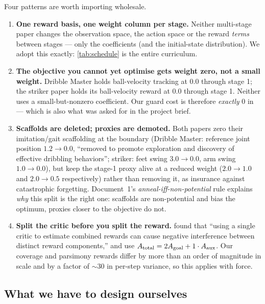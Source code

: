\documentclass[11pt,a4paper]{article}
\begin{document}
Four patterns are worth importing wholesale.

\begin{enumerate}[label=\textbf{P\arabic*.},leftmargin=2.7em]
  \item \textbf{One reward basis, one weight column per stage.} Neither multi-stage paper
        changes the observation space, the action space or the reward \emph{terms} between
        stages --- only the coefficients (and the initial-state distribution). We adopt this
        exactly: \cref{tab:schedule} is the entire curriculum.
  \item \textbf{The objective you cannot yet optimise gets weight zero, not a small weight.}
        Dribble Master holds ball-velocity tracking at $0.0$ through stage 1;
        the striker paper holds its ball-velocity reward at $0.0$ through stage 1. Neither
        uses a small-but-nonzero coefficient. Our guard cost is therefore \emph{exactly}
        $0$ in \stageI{} --- which is also what was asked for in the project brief.
  \item \textbf{Scaffolds are deleted; proxies are demoted.} Both papers zero their
        imitation/gait scaffolding at the boundary (Dribble Master: reference joint
        position $1.2 \to 0.0$, ``removed to promote exploration and discovery of effective
        dribbling behaviors''; striker: feet swing $3.0 \to 0.0$, arm swing $1.0 \to 0.0$),
        but keep the stage-1 proxy alive at a reduced weight ($2.0 \to 1.0$ and
        $2.0 \to 0.5$ respectively) rather than removing it, as insurance against
        catastrophic forgetting. Document~1's \emph{anneal-iff-non-potential} rule explains \emph{why} this
        split is the right one: scaffolds are non-potential and bias the optimum, proxies
        closer to the objective do not.
  \item \textbf{Split the critic before you split the reward.}
        \citet{wang2025vision} found that ``using a single critic to estimate combined
        rewards can cause negative interference between distinct reward components,'' and
        use $A_{\mathrm{total}} = 2A_{\mathrm{goal}} + 1\cdot A_{\mathrm{aux}}$. Our
        coverage and parsimony rewards differ by more than an order of magnitude in scale
        and by a factor of $\sim\!30$ in per-step variance, so this applies with force.
\end{enumerate}

\subsection{What we have to design ourselves}
\end{document}
